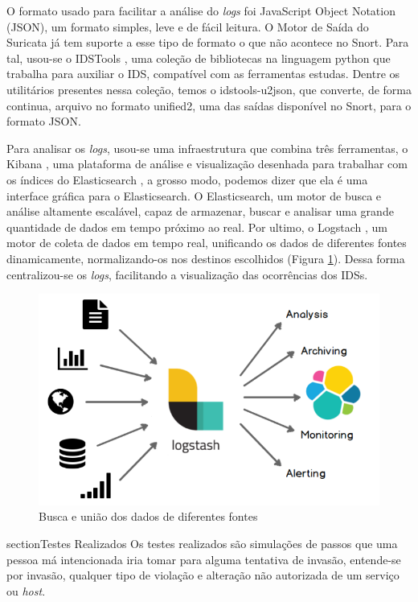\documentclass[
	12pt,				
	openright,		
	twoside,	
	a4paper,
	english,	
	brazil	
	]{abntex2}
\begin{document}
O formato usado para facilitar a análise do \textit{logs} foi JavaScript Object Notation (JSON), um formato simples, leve e de fácil leitura. O Motor de Saída do Suricata já tem suporte a esse tipo de formato o que não acontece no Snort. Para tal, usou-se o IDSTools \cite{py-idstools}, uma coleção de bibliotecas na linguagem python que trabalha para auxiliar o IDS, compatível com as ferramentas estudas. Dentre os utilitários presentes nessa coleção, temos o idstools-u2json, que converte, de forma continua, arquivo no formato unified2, uma das saídas disponível no Snort, para o formato JSON.

Para analisar os \textit{logs}, usou-se uma infraestrutura que combina três ferramentas, o Kibana \cite{kibana}, uma plataforma de análise e visualização desenhada para trabalhar com os índices do Elasticsearch \cite{elasticsearch}, a grosso modo, podemos dizer que ela é uma interface gráfica para o Elasticsearch. O Elasticsearch, um motor de busca e análise altamente escalável, capaz de armazenar, buscar e analisar uma grande quantidade de dados em tempo próximo ao real. Por ultimo, o Logstach \cite{logstach}, um motor de coleta de dados em tempo real, unificando os dados de diferentes fontes dinamicamente, normalizando-os nos destinos escolhidos (Figura \ref{fig:logstach}). Dessa forma centralizou-se os \textit{logs}, facilitando a visualização das ocorrências dos IDSs. 

\begin{figure}[!htb]
 \centering
 \includegraphics[scale=.4]{logstach.png}
 \caption{Busca e união dos dados de diferentes fontes}
 \label{fig:logstach}
\end{figure}
section{Testes Realizados} \label{sec:testes}
Os testes realizados são simulações de passos que uma pessoa má intencionada iria tomar para alguma tentativa de invasão, entende-se por invasão, qualquer tipo de violação e alteração não autorizada de um serviço ou \textit{host}.
\end{document}
